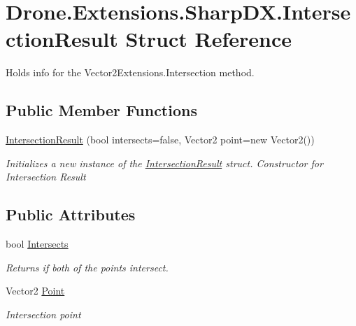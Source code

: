 \hypertarget{struct_drone_1_1_extensions_1_1_sharp_d_x_1_1_intersection_result}{}\section{Drone.\+Extensions.\+Sharp\+D\+X.\+Intersection\+Result Struct Reference}
\label{struct_drone_1_1_extensions_1_1_sharp_d_x_1_1_intersection_result}


Holds info for the Vector2\+Extensions.\+Intersection method.  


\subsection*{Public Member Functions}
\begin{DoxyCompactItemize}
\item 
\hyperlink{struct_drone_1_1_extensions_1_1_sharp_d_x_1_1_intersection_result_a01a2daae5ba70039a3fb50b25ca515a9}{Intersection\+Result} (bool intersects=false, Vector2 point=new Vector2())
\begin{DoxyCompactList}\small\item\em Initializes a new instance of the \hyperlink{struct_drone_1_1_extensions_1_1_sharp_d_x_1_1_intersection_result}{Intersection\+Result} struct. Constructor for Intersection Result \end{DoxyCompactList}\end{DoxyCompactItemize}
\subsection*{Public Attributes}
\begin{DoxyCompactItemize}
\item 
bool \hyperlink{struct_drone_1_1_extensions_1_1_sharp_d_x_1_1_intersection_result_a53750e288ee28b662e64de427be78274}{Intersects}
\begin{DoxyCompactList}\small\item\em Returns if both of the points intersect. \end{DoxyCompactList}\item 
Vector2 \hyperlink{struct_drone_1_1_extensions_1_1_sharp_d_x_1_1_intersection_result_a05f595d10cdea02a9a6b9604099e7340}{Point}
\begin{DoxyCompactList}\small\item\em Intersection point \end{DoxyCompactList}\end{DoxyCompactItemize}


